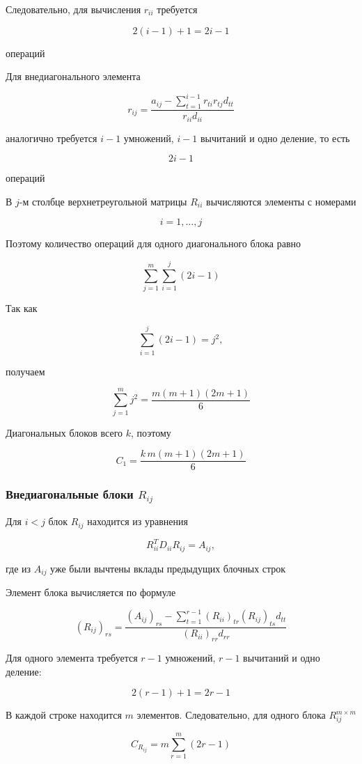 \documentclass[a4paper,12pt]{article}
\begin{document}
Следовательно, для вычисления \(r_{ii}\) требуется

$$
2(i-1)+1=2i-1
$$

операций

Для внедиагонального элемента

$$
r_{ij}
=
\frac{
  a_{ij}
  -
  \sum_{t=1}^{i-1}r_{ti}r_{tj}d_{tt}
}{
  r_{ii}d_{ii}
}
$$

аналогично требуется \(i-1\) умножений, \(i-1\) вычитаний и одно деление, то есть

$$
2i-1
$$

операций

В \(j\)-м столбце верхнетреугольной матрицы \(R_{ii}\) вычисляются элементы с номерами

$$
i=1,\ldots,j
$$

Поэтому количество операций для одного диагонального блока равно

$$
\sum_{j=1}^{m}\sum_{i=1}^{j}(2i-1)
$$

Так как

$$
\sum_{i=1}^{j}(2i-1)=j^2,
$$

получаем

$$
\sum_{j=1}^{m}j^2
=
\frac{m(m+1)(2m+1)}{6}
$$

Диагональных блоков всего \(k\), поэтому

$$
C_1
=
\frac{k\,m(m+1)(2m+1)}{6}
$$

\subsubsection{Внедиагональные блоки \(R_{ij}\)}

Для \(i<j\) блок \(R_{ij}\) находится из уравнения

$$
R_{ii}^{T}D_{ii}R_{ij}=A_{ij},
$$

где из \(A_{ij}\) уже были вычтены вклады предыдущих блочных строк

Элемент блока вычисляется по формуле

$$
(R_{ij})_{rs}
=
\frac{
  (A_{ij})_{rs}
  -
  \sum_{t=1}^{r-1}
  (R_{ii})_{tr}(R_{ij})_{ts}d_{tt}
}{
  (R_{ii})_{rr}d_{rr}
}
$$

Для одного элемента требуется \(r-1\) умножений, \(r-1\) вычитаний и одно деление:

$$
2(r-1)+1=2r-1
$$

В каждой строке находится \(m\) элементов. Следовательно, для одного блока \(R_{ij}^{m\times m}\)

$$
C_{R_{ij}}
=
m\sum_{r=1}^{m}(2r-1)
$$
\end{document}
